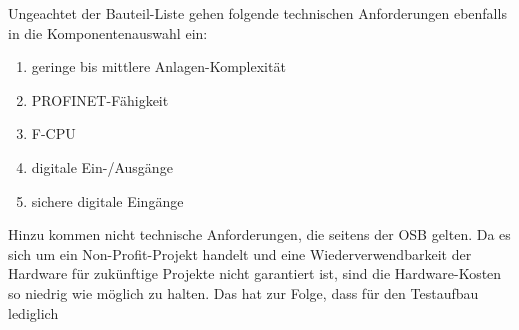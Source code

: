 Ungeachtet der Bauteil-Liste gehen folgende technischen Anforderungen ebenfalls in die Komponentenauswahl ein:

 \begin{enumerate}
    \itemsep0.1em
    \item geringe bis mittlere Anlagen-Komplexität
    \item PROFINET-Fähigkeit
    \item F-CPU
    \item digitale Ein-/Ausgänge
    \item sichere digitale Eingänge
 \end{enumerate}

 Hinzu kommen nicht technische Anforderungen, die seitens der OSB gelten. Da es sich um ein Non-Profit-Projekt handelt und eine Wiederverwendbarkeit der Hardware für zukünftige Projekte nicht garantiert ist, sind die Hardware-Kosten so niedrig wie möglich zu halten. Das hat zur Folge, dass für den Testaufbau lediglich 




